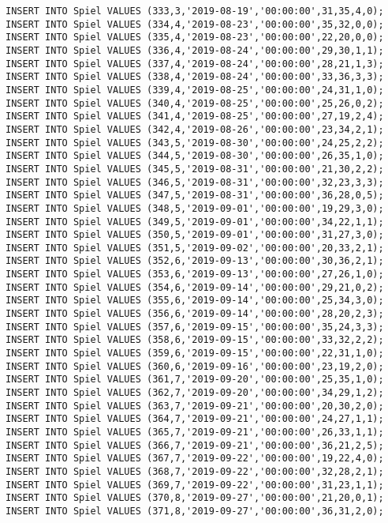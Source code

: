 \documentclass{bschlangaul-aufgabe}
\begin{document}
\begin{verbatim}
INSERT INTO Spiel VALUES (333,3,'2019-08-19','00:00:00',31,35,4,0);
INSERT INTO Spiel VALUES (334,4,'2019-08-23','00:00:00',35,32,0,0);
INSERT INTO Spiel VALUES (335,4,'2019-08-23','00:00:00',22,20,0,0);
INSERT INTO Spiel VALUES (336,4,'2019-08-24','00:00:00',29,30,1,1);
INSERT INTO Spiel VALUES (337,4,'2019-08-24','00:00:00',28,21,1,3);
INSERT INTO Spiel VALUES (338,4,'2019-08-24','00:00:00',33,36,3,3);
INSERT INTO Spiel VALUES (339,4,'2019-08-25','00:00:00',24,31,1,0);
INSERT INTO Spiel VALUES (340,4,'2019-08-25','00:00:00',25,26,0,2);
INSERT INTO Spiel VALUES (341,4,'2019-08-25','00:00:00',27,19,2,4);
INSERT INTO Spiel VALUES (342,4,'2019-08-26','00:00:00',23,34,2,1);
INSERT INTO Spiel VALUES (343,5,'2019-08-30','00:00:00',24,25,2,2);
INSERT INTO Spiel VALUES (344,5,'2019-08-30','00:00:00',26,35,1,0);
INSERT INTO Spiel VALUES (345,5,'2019-08-31','00:00:00',21,30,2,2);
INSERT INTO Spiel VALUES (346,5,'2019-08-31','00:00:00',32,23,3,3);
INSERT INTO Spiel VALUES (347,5,'2019-08-31','00:00:00',36,28,0,5);
INSERT INTO Spiel VALUES (348,5,'2019-09-01','00:00:00',19,29,3,0);
INSERT INTO Spiel VALUES (349,5,'2019-09-01','00:00:00',34,22,1,1);
INSERT INTO Spiel VALUES (350,5,'2019-09-01','00:00:00',31,27,3,0);
INSERT INTO Spiel VALUES (351,5,'2019-09-02','00:00:00',20,33,2,1);
INSERT INTO Spiel VALUES (352,6,'2019-09-13','00:00:00',30,36,2,1);
INSERT INTO Spiel VALUES (353,6,'2019-09-13','00:00:00',27,26,1,0);
INSERT INTO Spiel VALUES (354,6,'2019-09-14','00:00:00',29,21,0,2);
INSERT INTO Spiel VALUES (355,6,'2019-09-14','00:00:00',25,34,3,0);
INSERT INTO Spiel VALUES (356,6,'2019-09-14','00:00:00',28,20,2,3);
INSERT INTO Spiel VALUES (357,6,'2019-09-15','00:00:00',35,24,3,3);
INSERT INTO Spiel VALUES (358,6,'2019-09-15','00:00:00',33,32,2,2);
INSERT INTO Spiel VALUES (359,6,'2019-09-15','00:00:00',22,31,1,0);
INSERT INTO Spiel VALUES (360,6,'2019-09-16','00:00:00',23,19,2,0);
INSERT INTO Spiel VALUES (361,7,'2019-09-20','00:00:00',25,35,1,0);
INSERT INTO Spiel VALUES (362,7,'2019-09-20','00:00:00',34,29,1,2);
INSERT INTO Spiel VALUES (363,7,'2019-09-21','00:00:00',20,30,2,0);
INSERT INTO Spiel VALUES (364,7,'2019-09-21','00:00:00',24,27,1,1);
INSERT INTO Spiel VALUES (365,7,'2019-09-21','00:00:00',26,33,1,1);
INSERT INTO Spiel VALUES (366,7,'2019-09-21','00:00:00',36,21,2,5);
INSERT INTO Spiel VALUES (367,7,'2019-09-22','00:00:00',19,22,4,0);
INSERT INTO Spiel VALUES (368,7,'2019-09-22','00:00:00',32,28,2,1);
INSERT INTO Spiel VALUES (369,7,'2019-09-22','00:00:00',31,23,1,1);
INSERT INTO Spiel VALUES (370,8,'2019-09-27','00:00:00',21,20,0,1);
INSERT INTO Spiel VALUES (371,8,'2019-09-27','00:00:00',36,31,2,0);

\end{verbatim}
\end{document}
